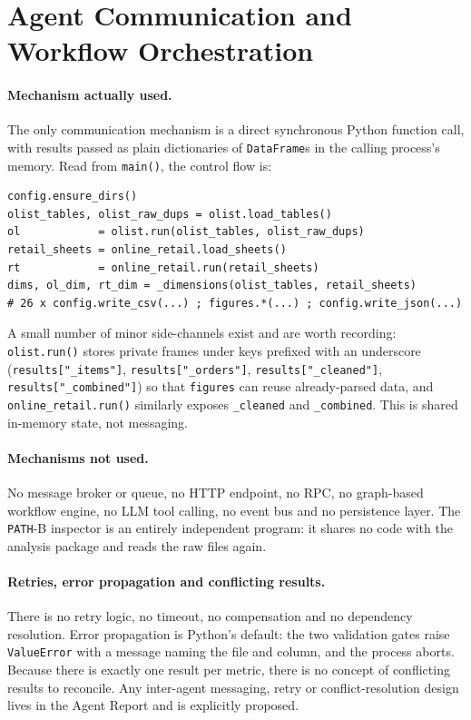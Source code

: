 \documentclass[11pt,a4paper]{article}
\newcommand{\code}[1]{\texttt{#1}}
\begin{document}
\section{Agent Communication and Workflow Orchestration}
\label{sec:comms}
\paragraph{Mechanism actually used.} The only communication mechanism is a direct synchronous Python function call, with results passed as plain dictionaries of \texttt{DataFrame}s in the calling process's memory. Read from \code{main()}, the control flow is:

\begin{verbatim}
config.ensure_dirs()
olist_tables, olist_raw_dups = olist.load_tables()
ol            = olist.run(olist_tables, olist_raw_dups)
retail_sheets = online_retail.load_sheets()
rt            = online_retail.run(retail_sheets)
dims, ol_dim, rt_dim = _dimensions(olist_tables, retail_sheets)
# 26 x config.write_csv(...) ; figures.*(...) ; config.write_json(...)
\end{verbatim}

A small number of minor side-channels exist and are worth recording: \code{olist.run()} stores private frames under keys prefixed with an underscore (\code{results["\_items"]}, \code{results["\_orders"]}, \code{results["\_cleaned"]}, \code{results["\_combined"]}) so that \code{figures} can reuse already-parsed data, and \code{online\_retail.run()} similarly exposes \code{\_cleaned} and \code{\_combined}. This is shared in-memory state, not messaging.

\paragraph{Mechanisms not used.} No message broker or queue, no HTTP endpoint, no RPC, no graph-based workflow engine, no LLM tool calling, no event bus and no persistence layer. The \code{PATH}-B inspector is an entirely independent program: it shares no code with the analysis package and reads the raw files again.

\paragraph{Retries, error propagation and conflicting results.} There is no retry logic, no timeout, no compensation and no dependency resolution. Error propagation is Python's default: the two validation gates raise \code{ValueError} with a message naming the file and column, and the process aborts. Because there is exactly one result per metric, there is no concept of conflicting results to reconcile. Any inter-agent messaging, retry or conflict-resolution design lives in the Agent Report and is explicitly proposed.
\end{document}
